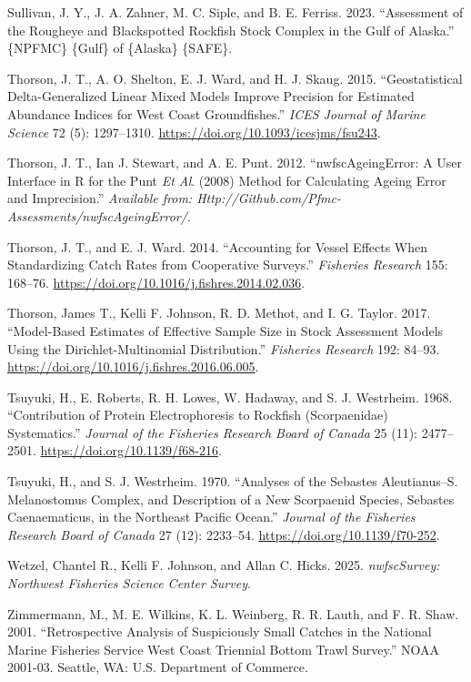 \documentclass[
]{scrartcl}
\newlength{\cslhangindent}
\newenvironment{CSLReferences}[2] %
 {\begin{list}{}{%
  \setlength{\itemindent}{0pt}
  \setlength{\leftmargin}{0pt}
  \setlength{\parsep}{0pt}
  \ifodd #1
   \setlength{\leftmargin}{\cslhangindent}
   \setlength{\itemindent}{-1\cslhangindent}
  \fi
  \setlength{\itemsep}{#2\baselineskip}}}
 {\end{list}}
\begin{document}
\begin{CSLReferences}{1}{0}
Sullivan, J. Y., J. A. Zahner, M. C. Siple, and B. E. Ferriss. 2023.
{``Assessment of the {Rougheye} and {Blackspotted} {Rockfish} Stock
Complex in the {Gulf} of {Alaska}.''} \{NPFMC\} \{Gulf\} of \{Alaska\}
\{SAFE\}.

Thorson, J. T., A. O. Shelton, E. J. Ward, and H. J. Skaug. 2015.
{``Geostatistical Delta-Generalized Linear Mixed Models Improve
Precision for Estimated Abundance Indices for {West} {Coast}
Groundfishes.''} \emph{ICES Journal of Marine Science} 72 (5):
1297--1310. \url{https://doi.org/10.1093/icesjms/fsu243}.

Thorson, J. T., Ian J. Stewart, and A. E. Punt. 2012.
{``{nwfscAgeingError}: A User Interface in {R} for the {P}unt \emph{Et
Al}. (2008) Method for Calculating Ageing Error and Imprecision.''}
\emph{Available from:
Http://Github.com/Pfmc-Assessments/nwfscAgeingError/}.

Thorson, J. T., and E. J. Ward. 2014. {``Accounting for Vessel Effects
When Standardizing Catch Rates from Cooperative Surveys.''}
\emph{Fisheries Research} 155: 168--76.
\url{https://doi.org/10.1016/j.fishres.2014.02.036}.

Thorson, James T., Kelli F. Johnson, R. D. Methot, and I. G. Taylor.
2017. {``Model-Based Estimates of Effective Sample Size in Stock
Assessment Models Using the {Dirichlet}-Multinomial Distribution.''}
\emph{Fisheries Research} 192: 84--93.
\url{https://doi.org/10.1016/j.fishres.2016.06.005}.

Tsuyuki, H., E. Roberts, R. H. Lowes, W. Hadaway, and S. J. Westrheim.
1968. {``Contribution of {Protein} {Electrophoresis} to {Rockfish}
({Scorpaenidae}) {Systematics}.''} \emph{Journal of the Fisheries
Research Board of Canada} 25 (11): 2477--2501.
\url{https://doi.org/10.1139/f68-216}.

Tsuyuki, H., and S. J. Westrheim. 1970. {``Analyses of the {Sebastes}
Aleutianus--{S}. Melanostomus {Complex}, and {Description} of a New
{Scorpaenid} {Species}, {Sebastes} Caenaematicus, in the {Northeast}
{Pacific} {Ocean}.''} \emph{Journal of the Fisheries Research Board of
Canada} 27 (12): 2233--54. \url{https://doi.org/10.1139/f70-252}.

Wetzel, Chantel R., Kelli F. Johnson, and Allan C. Hicks. 2025.
\emph{nwfscSurvey: Northwest Fisheries Science Center Survey}.

Zimmermann, M., M. E. Wilkins, K. L. Weinberg, R. R. Lauth, and F. R.
Shaw. 2001. {``Retrospective Analysis of Suspiciously Small Catches in
the {N}ational {M}arine {F}isheries {S}ervice West Coast Triennial
Bottom Trawl Survey.''} NOAA 2001-03. Seattle, WA: {U}.{S}. Department
of Commerce.

\end{CSLReferences}
\end{document}
